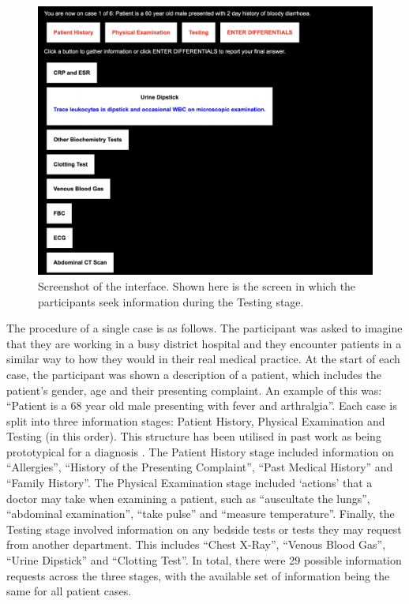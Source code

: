 \documentclass[a4paper, nobind]{templates/ociamthesis}
\begin{document}
\begin{figure}[H]

{\centering \includegraphics[width=1\linewidth]{./assets/Screenshot1} 

}

\caption{Screenshot of the interface. Shown here is the screen in which the participants seek information during the Testing stage.}\label{fig:screenshot1}
\end{figure}

The procedure of a single case is as follows. The participant was asked to imagine that they are working in a busy district hospital and they encounter patients in a similar way to how they would in their real medical practice. At the start of each case, the participant was shown a description of a patient, which includes the patient's gender, age and their presenting complaint. An example of this was: ``Patient is a 68 year old male presenting with fever and arthralgia''. Each case is split into three information stages: Patient History, Physical Examination and Testing (in this order). This structure has been utilised in past work as being prototypical for a diagnosis \autocite{hampton_relative_1975,peterson_contributions_1992}. The Patient History stage included information on ``Allergies'', ``History of the Presenting Complaint'', ``Past Medical History'' and ``Family History''. The Physical Examination stage included `actions' that a doctor may take when examining a patient, such as ``auscultate the lungs'', ``abdominal examination'', ``take pulse'' and ``measure temperature''. Finally, the Testing stage involved information on any bedside tests or tests they may request from another department. This includes ``Chest X-Ray'', ``Venous Blood Gas'', ``Urine Dipstick'' and ``Clotting Test''. In total, there were 29 possible information requests across the three stages, with the available set of information being the same for all patient cases.\\
\end{document}
